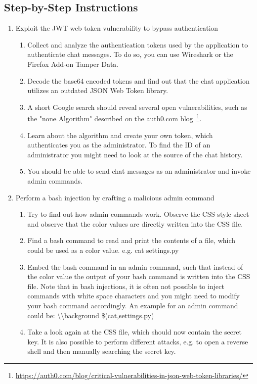 \documentclass[12pt,a4paper]{article}
\begin{document}
\subsection{Step-by-Step Instructions}
\begin{enumerate}
	\item Exploit the JWT web token vulnerability to bypass authentication
	\begin{enumerate}
		\item Collect and analyze the authentication tokens used by the application to authenticate chat messages. To do so, you can use Wireshark or the Firefox Add-on Tamper Data.
		\item Decode the base64 encoded tokens and find out that the chat application utilizes an outdated JSON Web Token library.
		\item A short Google search should reveal several open vulnerabilities, such as the "none Algorithm" described on the auth0.com blog~\footnote{\url{https://auth0.com/blog/critical-vulnerabilities-in-json-web-token-libraries/}}.
		\item Learn about the algorithm and create your own token, which authenticates you as the administrator. To find the ID of an administrator you might need to look at the source of the chat history.
		\item You should be able to send chat messages as an administrator and invoke admin commands.
	\end{enumerate}
	\item Perform a bash injection by crafting a malicious admin command
	\begin{enumerate}
		\item Try to find out how admin commands work. Observe the CSS style sheet and observe that the color values are directly written into the CSS file.
		\item Find a bash command to read and print the contents of a file, which could be used as a color value. e.g. cat settings.py
		\item Embed the bash command in an admin command, such that instead of the color value the output of your bash command is written into the CSS file. Note that in bash injections, it is often not possible to inject commands with white space characters and you might need to modify your bash command accordingly. An example for an admin command could be: \textbackslash\textbackslash background \$({cat,settings.py})
		\item Take a look again at the CSS file, which should now contain the secret key. It is also possible to perform different attacks, e.g. to open a reverse shell and then manually searching the secret key.
	\end{enumerate}
	
\end{enumerate}
\end{document}
